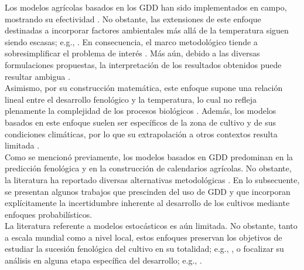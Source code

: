 


Los modelos agrícolas basados en los GDD han sido implementados en campo, mostrando su efectividad \cite{Callejas-Rodriguez_2023,Flores-Gallardo_2012,Tsimba_2013}. No obstante, las extensiones de este enfoque destinadas a incorporar factores ambientales más allá de la temperatura siguen siendo escasas; e.g., \cite{Thompson_2006}. En consecuencia, el marco metodológico tiende a sobresimplificar el problema de interés \cite{Makouate_2025}. Más aún, debido a las diversas formulaciones propuestas, la interpretación de los resultados obtenidos puede resultar ambigua \cite{MCMASTER_1997}.\\

Asimismo, por su construcción matemática, este enfoque supone una relación lineal entre el desarrollo fenológico y la temperatura, lo cual no refleja plenamente la complejidad de los procesos biológicos \cite{Klaring_2016}. Además, los modelos basados en este enfoque suelen ser específicos de la zona de cultivo y de sus condiciones climáticas, por lo que su extrapolación a otros contextos resulta limitada \cite{Makouate_2025}.\\

Como se mencionó previamente, los modelos basados en GDD predominan en la predicción fenológica y en la construcción de calendarios agrícolas. No obstante, la literatura ha reportado diversas alternativas metodológicas \cite{Yang_2024}. En lo subsecuente, se presentan algunos trabajos que prescinden del uso de GDD y que incorporan explícitamente la incertidumbre inherente al desarrollo de los cultivos mediante enfoques probabilísticos.\\ 


La literatura referente a modelos estocásticos es aún limitada. No obstante, tanto a escala mundial como a nivel local, estos enfoques preservan los objetivos de estudiar la sucesión fenológica del cultivo en su totalidad; e.g., \cite{Franch_2022}, o focalizar su análisis en alguna etapa específica del desarrollo; e.g., \cite{Diez2012, Meenken_2021, Melaas2016, Shi_2025}.\\

